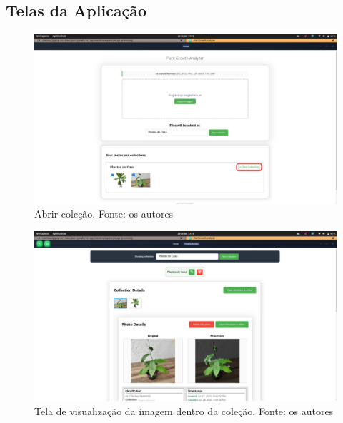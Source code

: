 \subsection{Telas da Aplicação}

\begin{figure}[H]
    \centering
    \includegraphics[width=1\textwidth]{../figures/screens/uc006/Screenshot from 2025-06-28 17-01-34.png}
    \caption{Abrir coleção. Fonte: os autores}
    \label{fig:uc006-screen1}
\end{figure}

\begin{figure}[H]
    \centering
    \includegraphics[width=1\textwidth]{../figures/screens/uc006/Screenshot from 2025-06-28 17-01-38.png}
    \caption{Tela de visualização da imagem dentro da coleção. Fonte: os autores}
    \label{fig:uc006-screen2}
\end{figure}

